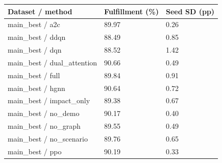 \begin{tabular}{lll}
\toprule
Dataset / method & Fulfillment (\%) & Seed SD (pp)\\
\midrule
main\_best / a2c & 89.97 & 0.26\\
main\_best / ddqn & 88.49 & 0.85\\
main\_best / dqn & 88.52 & 1.42\\
main\_best / dual\_attention & 90.66 & 0.49\\
main\_best / full & 89.84 & 0.91\\
main\_best / hgnn & 90.64 & 0.72\\
main\_best / impact\_only & 89.38 & 0.67\\
main\_best / no\_demo & 90.17 & 0.40\\
main\_best / no\_graph & 89.55 & 0.49\\
main\_best / no\_scenario & 89.76 & 0.65\\
main\_best / ppo & 90.19 & 0.33\\
\bottomrule
\end{tabular}